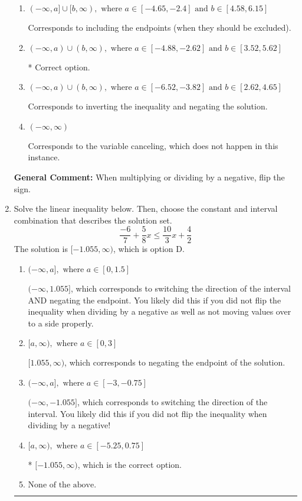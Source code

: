 \documentclass{extbook}[14pt]
\newcommand{\litem}[1]{\item #1

\rule{\textwidth}{0.4pt}}
\begin{document}
\begin{enumerate}
{\begin{enumerate}[label=\Alph*.]
Corresponds to including the endpoints AND negating.
\item \( (-\infty, a] \cup [b, \infty), \text{ where } a \in [-4.65, -2.4] \text{ and } b \in [4.58, 6.15] \)

Corresponds to including the endpoints (when they should be excluded).
\item \( (-\infty, a) \cup (b, \infty), \text{ where } a \in [-4.88, -2.62] \text{ and } b \in [3.52, 5.62] \)

 * Correct option.
\item \( (-\infty, a) \cup (b, \infty), \text{ where } a \in [-6.52, -3.82] \text{ and } b \in [2.62, 4.65] \)

Corresponds to inverting the inequality and negating the solution.
\item \( (-\infty, \infty) \)

Corresponds to the variable canceling, which does not happen in this instance.
\end{enumerate}

\textbf{General Comment:} When multiplying or dividing by a negative, flip the sign.
}
\litem{
Solve the linear inequality below. Then, choose the constant and interval combination that describes the solution set.
\[ \frac{-6}{7} + \frac{5}{8} x \leq \frac{10}{3} x + \frac{4}{2} \]The solution is \( [-1.055, \infty) \), which is option D.\begin{enumerate}[label=\Alph*.]
\item \( (-\infty, a], \text{ where } a \in [0, 1.5] \)

 $(-\infty, 1.055]$, which corresponds to switching the direction of the interval AND negating the endpoint. You likely did this if you did not flip the inequality when dividing by a negative as well as not moving values over to a side properly.
\item \( [a, \infty), \text{ where } a \in [0, 3] \)

 $[1.055, \infty)$, which corresponds to negating the endpoint of the solution.
\item \( (-\infty, a], \text{ where } a \in [-3, -0.75] \)

 $(-\infty, -1.055]$, which corresponds to switching the direction of the interval. You likely did this if you did not flip the inequality when dividing by a negative!
\item \( [a, \infty), \text{ where } a \in [-5.25, 0.75] \)

* $[-1.055, \infty)$, which is the correct option.
\item \( \text{None of the above}. \)


\end{enumerate}}
\end{enumerate}
\end{document}
